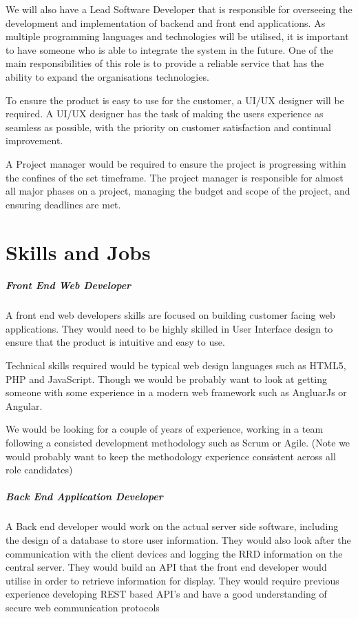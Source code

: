 \documentclass[11pt, oneside, a4paper, titlepage]{article}
\begin{document}
We will also have a Lead Software Developer that is responsible for overseeing the development and implementation of backend and front end applications. As multiple programming languages and technologies will be utilised, it is important to have someone who is able to integrate the system in the future. One of the main responsibilities of this role is to provide a reliable service that has the ability to expand the organisations technologies.  

To ensure the product is easy to use for the customer, a UI/UX designer will be required. A UI/UX designer has the task of making the users experience as seamless as possible, with the priority on customer satisfaction and continual improvement.  

A Project manager would be required to ensure the project is progressing within the confines of the set timeframe. The project manager is responsible for almost all major phases on a project, managing the budget and scope of the project, and ensuring deadlines are met.  


\part{Skills and Jobs}
\subsubsection{Front End Web Developer}
A front end web developers skills are focused on building customer facing web applications. They would need to be highly skilled in User Interface design to ensure that the product is intuitive and easy to use. 

Technical skills required would be typical web design languages such as HTML5, PHP and JavaScript. Though we would be probably want to look at getting someone with some experience in a modern web framework such as AngluarJs or Angular. 

We would be looking for a couple of years of experience, working in a team following a consisted development methodology such as Scrum or Agile.  (Note we would probably want to keep the methodology experience consistent across all role candidates)  

\subsubsection{Back End Application Developer}
A Back end developer would work on the actual server side software, including the design of a database to store user information.  They would also look after the communication with the client devices and logging the RRD information on the central server.  They would build an API that the front end developer would utilise in order to retrieve information for display.  They would require previous experience developing REST based API's and have a good understanding of secure web communication protocols 
\end{document}
